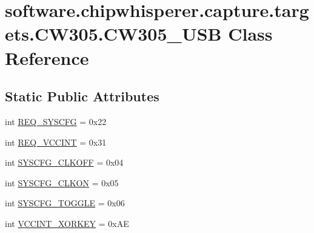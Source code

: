 \hypertarget{classsoftware_1_1chipwhisperer_1_1capture_1_1targets_1_1CW305_1_1CW305__USB}{}\section{software.\+chipwhisperer.\+capture.\+targets.\+C\+W305.\+C\+W305\+\_\+\+U\+S\+B Class Reference}
\label{classsoftware_1_1chipwhisperer_1_1capture_1_1targets_1_1CW305_1_1CW305__USB}
\subsection*{Static Public Attributes}
\begin{DoxyCompactItemize}
\item 
int \hyperlink{classsoftware_1_1chipwhisperer_1_1capture_1_1targets_1_1CW305_1_1CW305__USB_a3be74d86d10cc05bdba0f3504555ced1}{R\+E\+Q\+\_\+\+S\+Y\+S\+C\+F\+G} = 0x22
\item 
int \hyperlink{classsoftware_1_1chipwhisperer_1_1capture_1_1targets_1_1CW305_1_1CW305__USB_ab507cf7714e49033a6602db42848a20d}{R\+E\+Q\+\_\+\+V\+C\+C\+I\+N\+T} = 0x31
\item 
int \hyperlink{classsoftware_1_1chipwhisperer_1_1capture_1_1targets_1_1CW305_1_1CW305__USB_adc159b7ba3fa18d57d7a6ae8bbd109ca}{S\+Y\+S\+C\+F\+G\+\_\+\+C\+L\+K\+O\+F\+F} = 0x04
\item 
int \hyperlink{classsoftware_1_1chipwhisperer_1_1capture_1_1targets_1_1CW305_1_1CW305__USB_a317915bb4eb9a86358b4c3c444dbc0a1}{S\+Y\+S\+C\+F\+G\+\_\+\+C\+L\+K\+O\+N} = 0x05
\item 
int \hyperlink{classsoftware_1_1chipwhisperer_1_1capture_1_1targets_1_1CW305_1_1CW305__USB_a7cd4af38dd2ed5913bd5022a3a4de373}{S\+Y\+S\+C\+F\+G\+\_\+\+T\+O\+G\+G\+L\+E} = 0x06
\item 
int \hyperlink{classsoftware_1_1chipwhisperer_1_1capture_1_1targets_1_1CW305_1_1CW305__USB_a760ef20c59a18937d50f50ca410b454c}{V\+C\+C\+I\+N\+T\+\_\+\+X\+O\+R\+K\+E\+Y} = 0x\+A\+E
\end{DoxyCompactItemize}


